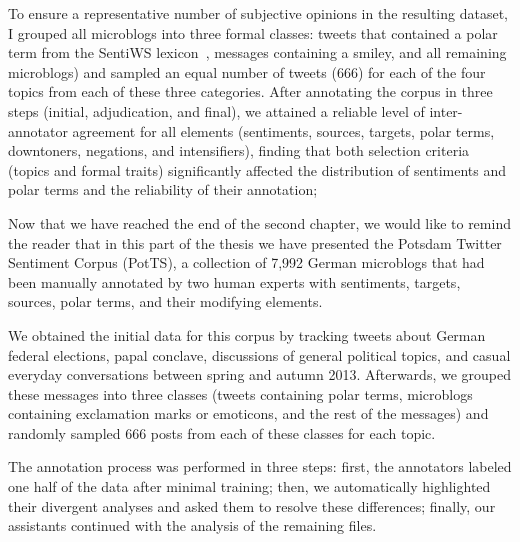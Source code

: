 \documentclass[11pt]{article}
\newcommand{\markable}[1]{\texttt{#1}}
\newcommand{\attribute}[1]{\emph{\texttt{#1}}}
\begin{document}
To ensure a representative number of subjective opinions in the
resulting dataset, I grouped all microblogs into three formal classes:
tweets that contained a polar term from the SentiWS
lexicon~\cite{Remus:10}, messages containing a smiley, and all
remaining microblogs) and sampled an equal number of tweets (666) for
each of the four topics from each of these three categories.  After
annotating the corpus in three steps (initial, adjudication, and
final), we attained a reliable level of inter-annotator agreement for
all elements (sentiments, sources, targets, polar terms, downtoners,
negations, and intensifiers), finding that both selection criteria
(topics and formal traits) significantly affected the distribution of
sentiments and polar terms and the reliability of their annotation;

Now that we have reached the end of the second chapter, we would like
to remind the reader that in this part of the thesis we have presented
the Potsdam Twitter Sentiment Corpus (PotTS), a collection of 7,992
German microblogs that had been manually annotated by two human
experts with sentiments, targets, sources, polar terms, and their
modifying elements.

We obtained the initial data for this corpus by tracking tweets about
German federal elections, papal conclave, discussions of general
political topics, and casual everyday conversations between spring and
autumn 2013.  Afterwards, we grouped these messages into three classes
(tweets containing polar terms, microblogs containing exclamation
marks or emoticons, and the rest of the messages) and randomly sampled
666 posts from each of these classes for each topic.


The annotation process was performed in three steps: first, the
annotators labeled one half of the data after minimal training; then,
we automatically highlighted their divergent analyses and asked them
to resolve these differences; finally, our assistants continued with
the analysis of the remaining files.
\end{document}
